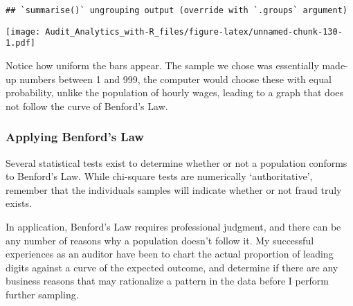 \documentclass[
]{book}
\newenvironment{Shaded}{\begin{snugshade}}{\end{snugshade}}
\newcommand{\DataTypeTok}[1]{\textcolor[rgb]{0.13,0.29,0.53}{#1}}
\newcommand{\DecValTok}[1]{\textcolor[rgb]{0.00,0.00,0.81}{#1}}
\newcommand{\KeywordTok}[1]{\textcolor[rgb]{0.13,0.29,0.53}{\textbf{#1}}}
\newcommand{\NormalTok}[1]{#1}
\newcommand{\OperatorTok}[1]{\textcolor[rgb]{0.81,0.36,0.00}{\textbf{#1}}}
\newcommand{\OtherTok}[1]{\textcolor[rgb]{0.56,0.35,0.01}{#1}}
\newcommand{\StringTok}[1]{\textcolor[rgb]{0.31,0.60,0.02}{#1}}
\begin{document}
\begin{Shaded}
\end{Shaded}

\begin{verbatim}
## `summarise()` ungrouping output (override with `.groups` argument)
\end{verbatim}

\texttt{[image: Audit\_Analytics\_with-R\_files/figure-latex/unnamed-chunk-130-1.pdf]}

Notice how uniform the bars appear. The sample we chose was essentially made-up numbers between 1 and 999, the computer would choose these with equal probability, unlike the population of hourly wages, leading to a graph that does not follow the curve of Benford's Law.

\hypertarget{applying-benfords-law}{%
\subsubsection{Applying Benford's Law}\label{applying-benfords-law}}

Several statistical tests exist to determine whether or not a population conforms to Benford's Law. While chi-square tests are numerically `authoritative', remember that the individuals samples will indicate whether or not fraud truly exists.

In application, Benford's Law requires professional judgment, and there can be any number of reasons why a population doesn't follow it. My successful experiences as an auditor have been to chart the actual proportion of leading digits against a curve of the expected outcome, and determine if there are any business reasons that may rationalize a pattern in the data before I perform further sampling.
\end{document}
